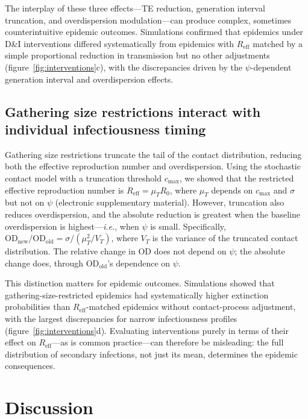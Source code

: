 \documentclass[10pt]{article}
\makeatletter
\newcommand{\ie}{\textit{i.e.}\@\xspace}
\makeatother
\begin{document}
The interplay of these three effects---TE reduction, generation interval truncation, and overdispersion modulation---can produce complex, sometimes counterintuitive epidemic outcomes. Simulations confirmed that epidemics under D\&I interventions differed systematically from epidemics with $R_\text{eff}$ matched by a simple proportional reduction in transmission but no other adjustments (figure~\ref{fig:interventions}c), with the discrepancies driven by the $\psi$-dependent generation interval and overdispersion effects.

\subsection{Gathering size restrictions interact with individual infectiousness timing}

Gathering size restrictions truncate the tail of the contact distribution, reducing both the effective reproduction number and overdispersion. Using the stochastic contact model with a truncation threshold $c_\text{max}$, we showed that the restricted effective reproduction number is $R_\text{eff} = \mu_T R_0$, where $\mu_T$ depends on $c_\text{max}$ and $\sigma$ but not on $\psi$ (electronic supplementary material). However, truncation also reduces overdispersion, and the absolute reduction is greatest when the baseline overdispersion is highest---\ie, when $\psi$ is small. Specifically, $\text{OD}_\text{new} / \text{OD}_\text{old} = \sigma / (\mu_T^2 / V_T)$, where $V_T$ is the variance of the truncated contact distribution. The relative change in OD does not depend on $\psi$; the absolute change does, through $\text{OD}_\text{old}$'s dependence on $\psi$.

This distinction matters for epidemic outcomes. Simulations showed that gathering-size-restricted epidemics had systematically higher extinction probabilities than $R_\text{eff}$-matched epidemics without contact-process adjustment, with the largest discrepancies for narrow infectiousness profiles (figure~\ref{fig:interventions}d). Evaluating interventions purely in terms of their effect on $R_\text{eff}$---as is common practice---can therefore be misleading: the full distribution of secondary infections, not just its mean, determines the epidemic consequences.


\section{Discussion}
\end{document}
